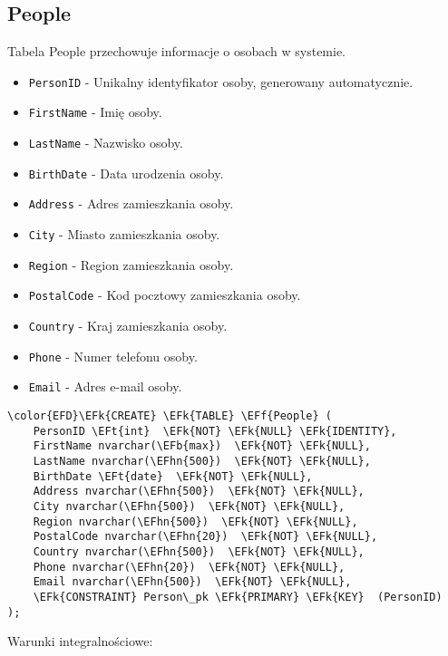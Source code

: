 \documentclass[11pt]{article}
\newcommand{\EFk}[1]{\textcolor{EFk}{\textbf{#1}}} %
\newcommand{\EFb}[1]{\textcolor{EFb}{\textbf{#1}}} %
\newcommand{\EFf}[1]{\textcolor{EFf}{#1}} %
\newcommand{\EFt}[1]{\textcolor{EFt}{\textbf{#1}}} %
\newcommand{\EFhn}[1]{\textcolor{EFhn}{#1}} %
\begin{document}
\subsection{People}
\label{sec:orgec1a283}
Tabela People przechowuje informacje o osobach w systemie.
\begin{itemize}
\item \texttt{PersonID} - Unikalny identyfikator osoby, generowany automatycznie.
\item \texttt{FirstName} - Imię osoby.
\item \texttt{LastName} - Nazwisko osoby.
\item \texttt{BirthDate} - Data urodzenia osoby.
\item \texttt{Address} - Adres zamieszkania osoby.
\item \texttt{City} - Miasto zamieszkania osoby.
\item \texttt{Region} - Region zamieszkania osoby.
\item \texttt{PostalCode} - Kod pocztowy zamieszkania osoby.
\item \texttt{Country} - Kraj zamieszkania osoby.
\item \texttt{Phone} - Numer telefonu osoby.
\item \texttt{Email} - Adres e-mail osoby.
\end{itemize}
\begin{Code}
\begin{Verbatim}
\color{EFD}\EFk{CREATE} \EFk{TABLE} \EFf{People} (
    PersonID \EFt{int}  \EFk{NOT} \EFk{NULL} \EFk{IDENTITY},
    FirstName nvarchar(\EFb{max})  \EFk{NOT} \EFk{NULL},
    LastName nvarchar(\EFhn{500})  \EFk{NOT} \EFk{NULL},
    BirthDate \EFt{date}  \EFk{NOT} \EFk{NULL},
    Address nvarchar(\EFhn{500})  \EFk{NOT} \EFk{NULL},
    City nvarchar(\EFhn{500})  \EFk{NOT} \EFk{NULL},
    Region nvarchar(\EFhn{500})  \EFk{NOT} \EFk{NULL},
    PostalCode nvarchar(\EFhn{20})  \EFk{NOT} \EFk{NULL},
    Country nvarchar(\EFhn{500})  \EFk{NOT} \EFk{NULL},
    Phone nvarchar(\EFhn{20})  \EFk{NOT} \EFk{NULL},
    Email nvarchar(\EFhn{500})  \EFk{NOT} \EFk{NULL},
    \EFk{CONSTRAINT} Person\_pk \EFk{PRIMARY} \EFk{KEY}  (PersonID)
);
\end{Verbatim}
\end{Code}
Warunki integralnościowe:
\end{document}
